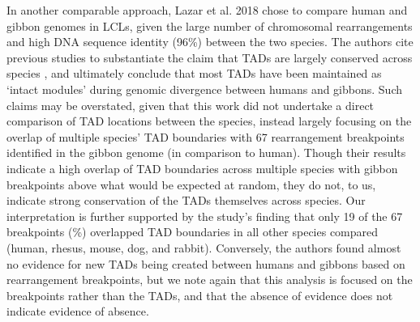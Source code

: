 In another comparable approach, Lazar et al. 2018 \cite{Lazar.2018} chose to compare human and gibbon genomes in LCLs, given the large number of chromosomal rearrangements and high DNA sequence identity (96\%) between the two species. The authors cite previous studies to substantiate the claim that TADs are largely conserved across species \cite{Dixon.2012, Rudan.2015}, and ultimately conclude that most TADs have been maintained as `intact modules' during genomic divergence between humans and gibbons. Such claims may be overstated, given that this work did not undertake a direct comparison of TAD locations between the species, instead largely focusing on the overlap of multiple species' TAD boundaries with 67 rearrangement breakpoints identified in the gibbon genome (in comparison to human). Though their results indicate a high overlap of TAD boundaries across multiple species with gibbon breakpoints above what would be expected at random, they do not, to us, indicate strong conservation of the TADs themselves across species. Our interpretation is further supported by the study's finding that only 19 of the 67 breakpoints (\%) overlapped TAD boundaries in all other species compared (human, rhesus, mouse, dog, and rabbit). Conversely, the authors found almost no evidence for new TADs being created between humans and gibbons based on rearrangement breakpoints, but we note again that this analysis is focused on the breakpoints rather than the TADs, and that the absence of evidence does not indicate evidence of absence.

